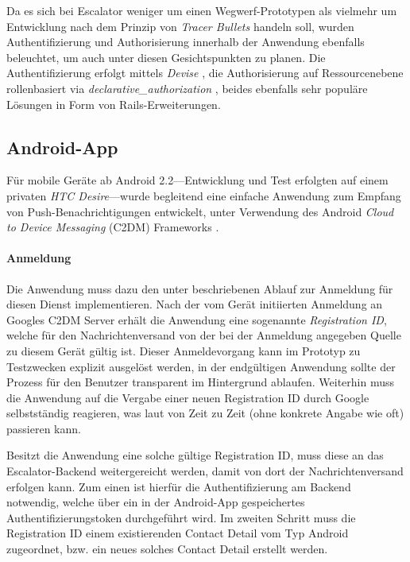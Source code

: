 \documentclass[11pt,utf8,notoc,bibnum,german,final]{zihpub}
\begin{document}
Da es sich bei Escalator weniger um einen Wegwerf-Prototypen als vielmehr um
Entwicklung nach dem Prinzip von \emph{Tracer Bullets} \cite{tracerbullets}
handeln soll, wurden Authentifizierung und Authorisierung innerhalb der
Anwendung ebenfalls beleuchtet, um auch unter diesen Gesichtspunkten zu planen.
Die Authentifizierung erfolgt mittels \emph{Devise} \cite{devise}, die
Authorisierung auf Ressourcenebene rollenbasiert via
\emph{declarative\_authorization} \cite{declarative-authorization}, beides
ebenfalls sehr populäre Lösungen in Form von Rails-Erweiterungen.


\subsection{Android-App}

Für mobile Geräte ab Android 2.2—Entwicklung und Test erfolgten auf einem
privaten \emph{HTC Desire}—wurde begleitend eine einfache Anwendung zum Empfang
von Push-Benachrichtigungen entwickelt, unter Verwendung des Android
\emph{Cloud to Device Messaging} (C2DM) Frameworks \cite{c2dm}.

\paragraph{Anmeldung}

Die Anwendung muss dazu den unter \cite{c2dm-lifecycle} beschriebenen Ablauf
zur Anmeldung für diesen Dienst implementieren. Nach der vom Gerät initiierten
Anmeldung an Googles C2DM Server erhält die Anwendung eine sogenannte
\emph{Registration ID}, welche für den Nachrichtenversand von der bei der
Anmeldung angegeben Quelle zu diesem Gerät gültig ist. Dieser Anmeldevorgang
kann im Prototyp zu Testzwecken explizit ausgelöst werden, in der endgültigen
Anwendung sollte der Prozess für den Benutzer transparent im Hintergrund
ablaufen. Weiterhin muss die Anwendung auf die Vergabe einer neuen Registration
ID durch Google selbstständig reagieren, was laut \cite{c2dm-lifecycle} von
Zeit zu Zeit (ohne konkrete Angabe wie oft) passieren kann.

Besitzt die Anwendung eine solche gültige Registration ID, muss diese an das
Escalator-Backend weitergereicht werden, damit von dort der Nachrichtenversand
erfolgen kann. Zum einen ist hierfür die Authentifizierung am Backend
notwendig, welche über ein in der Android-App gespeichertes
Authentifizierungstoken durchgeführt wird. Im zweiten Schritt muss die
Registration ID einem existierenden Contact Detail vom Typ Android zugeordnet,
bzw. ein neues solches Contact Detail erstellt werden.
\end{document}

